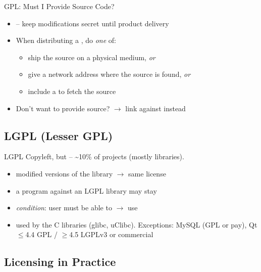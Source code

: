 \begin{KR}{GPL: Must I Provide Source Code?}
    \begin{itemize}
        \item {} -- keep modifications secret until
              product delivery
        \item When distributing a , do \emph{one} of:
        \begin{itemize}
            \item ship the source on a physical medium, \emph{or}
            \item give a network address where the source is found, \emph{or}
            \item include a  to fetch the source
        \end{itemize}
        \item Don't want to provide source? $\to$ link against  instead
    \end{itemize}
\end{KR}

\subsection{LGPL (Lesser GPL)}

\begin{definition}{LGPL}
    Copyleft, but  -- \textasciitilde10\% of projects (mostly libraries).
    \begin{itemize}
        \item modified versions of the library $\to$ same license
        \item a program  against an LGPL library may stay
        \item \emph{condition}: user must be able to  $\to$ use 
        \item used by the C libraries (glibc, uClibc). Exceptions: MySQL (GPL or pay),
              Qt $\leq$4.4 GPL / $\geq$4.5 LGPLv3 or commercial
    \end{itemize}
\end{definition}

\subsection{Licensing in Practice}

